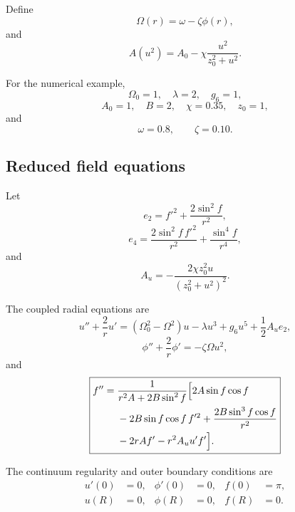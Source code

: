\documentclass[11pt]{article}
\begin{document}
Define
\begin{equation}
\Omega(r)
=
\omega-\zeta\phi(r),
\end{equation}
and
\begin{equation}
A(u^2)
=
A_0-\chi\frac{u^2}{z_0^2+u^2}.
\end{equation}

For the numerical example,
\begin{equation}
\Omega_0=1,\quad
\lambda=2,\quad
g_6=1,
\end{equation}
\begin{equation}
A_0=1,\quad
B=2,\quad
\chi=0.35,\quad
z_0=1,
\end{equation}
and
\begin{equation}
\omega=0.8,
\qquad
\zeta=0.10.
\end{equation}

\subsection{Reduced field equations}

Let
\begin{equation}
e_2
=
f'^2
+
\frac{2\sin^2f}{r^2},
\end{equation}
\begin{equation}
e_4
=
\frac{2\sin^2f\,f'^2}{r^2}
+
\frac{\sin^4f}{r^4},
\end{equation}
and
\begin{equation}
A_u
=
-\frac{2\chi z_0^2u}{(z_0^2+u^2)^2}.
\end{equation}

The coupled radial equations are
\begin{equation}
\boxed{
u''
+
\frac{2}{r}u'
=
(\Omega_0^2-\Omega^2)u
-
\lambda u^3
+
g_6u^5
+
\frac12A_u e_2,
}
\end{equation}
\begin{equation}
\boxed{
\phi''
+
\frac{2}{r}\phi'
=
-\zeta\Omega u^2,
}
\end{equation}
and
\begin{equation}
\boxed{
\begin{aligned}
f''={}&\frac{1}{r^2A+2B\sin^2 f}\Bigl[
2A\sin f\cos f
\\
&-2B\sin f\cos f\,f'^2
+\frac{2B\sin^3 f\cos f}{r^2}
\\
&-2rAf'-r^2A_u u'f'
\Bigr].
\end{aligned}
}
\end{equation}

The continuum regularity and outer boundary conditions are
\begin{align}
u'(0)&=0,
&
\phi'(0)&=0,
&
f(0)&=\pi,
\\
u(R)&=0,
&
\phi(R)&=0,
&
f(R)&=0.
\end{align}
\end{document}
